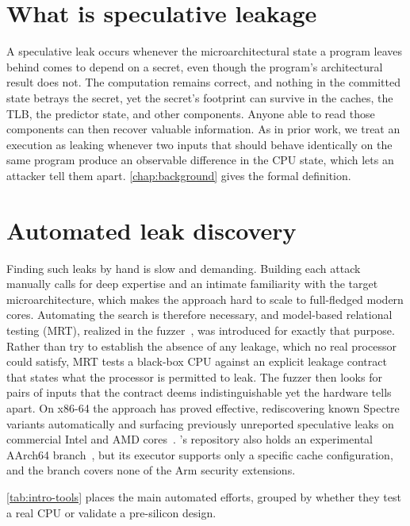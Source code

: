 \section{What is speculative leakage}
\label{sec:intro-leakage}

A speculative leak occurs whenever the microarchitectural state a program leaves behind
comes to depend on a secret, even though the program's architectural result does not. The
computation remains correct, and nothing in the committed state betrays the secret, yet the
secret's footprint can survive in the caches, the TLB, the predictor state, and other
components. Anyone able to read those components can then recover valuable information. As in
prior work, we treat an execution as leaking whenever two inputs that should behave
identically on the same program produce an observable difference in the CPU state, which lets
an attacker tell them apart. \autoref{chap:background} gives the formal definition.

\section{Automated leak discovery}
\label{sec:intro-automated}

Finding such leaks by hand is slow and demanding. Building each attack manually calls for
deep expertise and an intimate familiarity with the target microarchitecture, which makes the
approach hard to scale to full-fledged modern cores. Automating the search is therefore
necessary, and model-based relational testing (MRT), realized in the \revizor{}
fuzzer~\cite{revizor}, was introduced for exactly that purpose. Rather than try
to establish the absence of any leakage, which no real processor could satisfy, MRT tests a
black-box CPU against an explicit leakage contract that states what the processor is
permitted to leak. The fuzzer then looks for pairs of inputs that the contract deems
indistinguishable yet the hardware tells apart. On x86-64 the approach has proved effective,
rediscovering known Spectre variants automatically and surfacing previously unreported
speculative leaks on commercial Intel and AMD cores~\cite{revizor,hide_seek}. \revizor{}'s
repository also holds an experimental AArch64 branch~\cite{revizor_arm}, but its executor
supports only a specific cache configuration, and the branch covers none of the Arm security
extensions.

\autoref{tab:intro-tools} places the main automated efforts, grouped by whether they test a
real CPU or validate a pre-silicon design.

